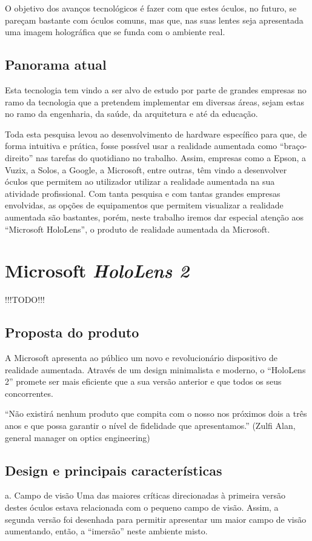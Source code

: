 \documentclass{report}
\begin{document}
O objetivo dos avanços tecnológicos é fazer com que estes óculos, no futuro, se pareçam bastante com óculos comuns, mas que, nas suas lentes seja apresentada uma
imagem holográfica que se funda com o ambiente real.

\section{Panorama atual}
Esta tecnologia tem vindo a ser alvo de estudo por parte de grandes empresas no ramo da tecnologia que a pretendem implementar em diversas áreas, sejam estas no ramo da engenharia, da saúde, da arquitetura e até da educação.

Toda esta pesquisa levou ao desenvolvimento de hardware específico para que, de forma intuitiva e prática, fosse possível usar a realidade aumentada como “braço-direito” nas tarefas do quotidiano no trabalho. Assim, empresas como a Epson, a Vuzix, a Solos, a Google, a Microsoft, entre outras, têm vindo a desenvolver óculos que permitem ao utilizador utilizar a realidade aumentada na sua atividade profissional. Com tanta pesquisa e com tantas grandes empresas envolvidas, as opções de equipamentos que permitem visualizar a realidade aumentada são bastantes, porém, neste trabalho iremos dar especial atenção aos “Microsoft HoloLens”, o produto de realidade aumentada da Microsoft.

\chapter{Microsoft \textit{HoloLens 2}}
\label{chap.microsoft-hololens-2}
!!!TODO!!!

\section{Proposta do produto}
A Microsoft apresenta ao público um novo e revolucionário dispositivo de realidade aumentada. Através de um design minimalista e moderno, o “HoloLens 2” promete ser mais eficiente que a sua versão anterior e que todos os seus concorrentes.

“Não existirá nenhum produto que compita com o nosso nos próximos dois a três anos e que possa garantir o nível de fidelidade que apresentamos.” (Zulfi Alan, general manager on optics engineering)

\section{Design e principais características}
a. Campo de visão
Uma das maiores críticas direcionadas à primeira versão destes óculos estava relacionada com o pequeno campo de visão. Assim, a segunda versão foi desenhada para permitir apresentar um maior campo de visão aumentando, então, a “imersão” neste ambiente misto.
\end{document}
